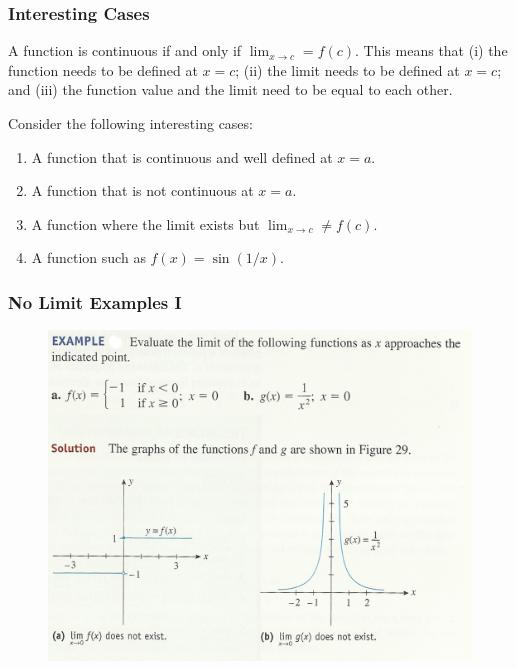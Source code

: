 \documentclass[xcolor=dvipsnames]{beamer}
\begin{document}
\begin{frame}
  \frametitle{Interesting Cases}
  A function is continuous if and only if
  $\lim_{x\rightarrow{}c}=f(c)$. This means that (i) the function
  needs to be defined at $x=c$; (ii) the limit needs to be defined at
  $x=c$; and (iii) the function value and the limit need to be equal
  to each other.

Consider the following interesting cases:
\begin{enumerate}
\item<1-> A function that is continuous and well defined at $x=a$.
\item<2-> A function that is not continuous at $x=a$.
\item<3-> A function where the limit exists but $\lim_{x\rightarrow{}c}\neq{}f(c)$.
\item<4-> A function such as $f(x)=\sin(1/x)$.
\end{enumerate}
\end{frame}


\begin{frame}
  \frametitle{No Limit Examples I}
  \begin{figure}[h]
    \includegraphics[scale=.9]{./limita.png}
  \end{figure}
\end{frame}
\end{document}
